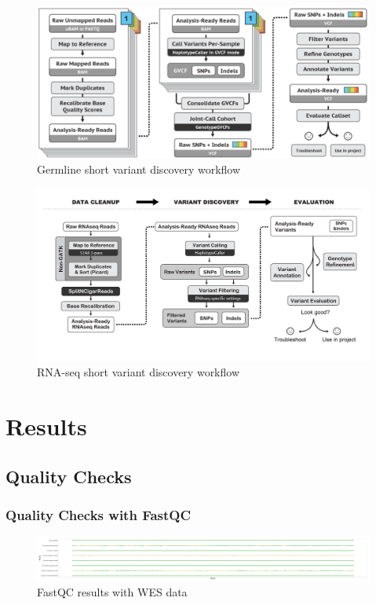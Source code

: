 \documentclass[11pt,a4paper,onecolumn,oneside]{report}
\begin{document}
            \begin{figure}[p]
                \centering
                \includegraphics[width=0.8 \linewidth]{figures/Workflow/germline_short_variant.png}
                \caption{Germline short variant discovery workflow \protect\cite{gatk1, gatk2}}
                \label{fig:workflow-germline}
            \end{figure}

            \begin{figure}[p]
                \centering
                \includegraphics[width=0.8 \linewidth]{figures/Workflow/RNA_short_variant.png}
                \caption{RNA-seq short variant discovery workflow \protect\cite{gatk1, gatk2}}
                \label{fig:workflow-RNA}
            \end{figure}
    \pagebreak

    \section{Results}
        \subsection{Quality Checks}
            \subsubsection{Quality Checks with FastQC}
                \begin{figure}[p]
                    \centering
                    \includegraphics[width=0.8 \linewidth]{figures/FastQC/FastQC_WES.pdf}
                    \caption{FastQC results with WES data}
                    \label{fig:fastqc-WES}
                \end{figure}
\end{document}
